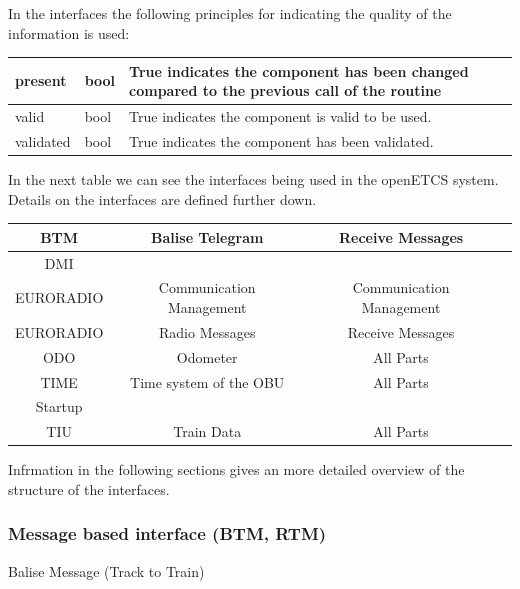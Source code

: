 \documentclass{template/openetcs_report}
\begin{document}
In the interfaces the following principles for indicating the quality of the information is used:


\begin{supertabular}{| p{2 cm} | p{2 cm} | p{8 cm} |}
present & bool & True indicates the component has been changed compared to the previous call of the routine
\\\hline 
valid & bool & True indicates the component is valid to be used. 
\\\hline 
validated & bool & True indicates the component has been validated.
\\\hline 
\end{supertabular}

In the next table we can see the interfaces being used in the openETCS system. Details on the interfaces are defined further down.

\begin{supertabular}{| c | c | c  | c |}
\gls{BTM} & Balise Telegram & Receive Messages & \\\hline
\gls{DMI} & & & \\\hline
EURORADIO & Communication Management & Communication Management & \\\hline
EURORADIO & Radio Messages & Receive Messages & \\\hline
\gls{ODO} & Odometer & All Parts & \\\hline
TIME & Time system of the OBU & All Parts & \\\hline
Startup & & & \\\hline
TIU & Train Data & All Parts & \\\hline
\end{supertabular}

Infrmation in the following sections gives an more detailed overview of the structure of the interfaces.


\subsubsection{Message based interface (BTM, RTM)}


Balise Message (Track to Train)\\
\end{document}

